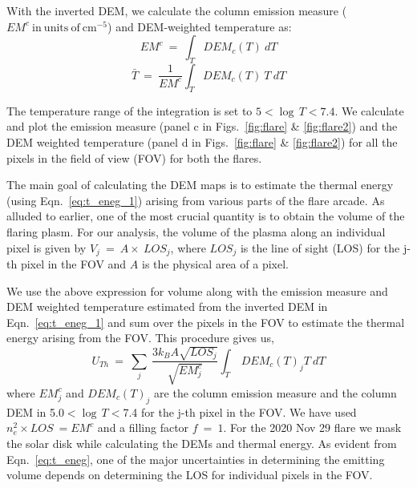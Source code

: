 With the inverted DEM, we calculate the column emission measure ($EM^{c}~\mathrm{in~units~of~cm^{-5}}$) and DEM-weighted temperature as:
\begin{equation}
    EM^{c}~=~\int_{T} DEM_{c}(T)~dT
\end{equation}
\begin{equation}
    \bar{T}~=~\frac{1}{EM^{c}}\int_{T} DEM_{c}(T)~T~dT
\end{equation}

The temperature range of the integration is set to $5 < \log\,T < 7.4$. We calculate and plot the emission measure (panel c in Figs.~\ref{fig:flare} \& \ref{fig:flare2}) and the DEM weighted temperature (panel d in Figs.~\ref{fig:flare} \& \ref{fig:flare2}) for all the pixels in the field of view (FOV) for both the flares.  

The main goal of calculating the DEM maps is to estimate the thermal energy (using Eqn.~\ref{eq:t_eneg_1}) arising from various parts of the flare arcade. As alluded to earlier, one of the most crucial quantity is to obtain the volume of the flaring plasm. For our analysis, the volume of the plasma along an individual pixel is given by $V_{j}~=~A\times~LOS_{j}$, where $LOS_{j}$ is the line of sight (LOS) for the j-th pixel in the FOV and $A$ is the physical area of a pixel.

We use the above expression for volume along with the emission measure and DEM weighted temperature estimated from the inverted DEM in Eqn.~\ref{eq:t_eneg_1} and sum over the pixels in the FOV to estimate the thermal energy arising from the FOV. This procedure gives us,
\begin{equation}
    U_{Th}~=~\sum_{j}~\frac{3k_{B}A\sqrt{LOS_{j}}}{\sqrt{EM^{c}_{j}}}\int_{T}~DEM_{c}(T)_{j}T~dT
    \label{eq:t_eneg}
\end{equation}
where $EM^{c}_{j}$ and $DEM_{c}(T)_{j}$ are the column emission measure and the column DEM in 5.0$<$$\log\,T$$<$7.4 for the j-th pixel in the FOV. We have used $n_{e}^{2}\times LOS~=EM^{c}$ and a filling factor $\textit{f}~=~1$. For the 2020 Nov 29 flare we mask the solar disk while calculating the DEMs and thermal energy. As evident from Eqn.~\ref{eq:t_eneg}, one of the major uncertainties in determining the emitting volume depends on determining the LOS for individual pixels in the FOV. 

